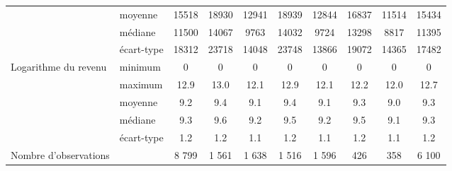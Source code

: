 \begin{Article}
\begin{refsection}[Bonnal]
\begin{appendices}
\begin{table}[!h]
{\begin{tabular}{l@{\;}l@{\;}S!{}S!{}S!{}S!{}S!{}S!{}S!{}S!{}}
		 & moyenne & 15518 & 18930 & 12941 & 18939 & 12844 & 16837 & 11514 & 15434 \\
		 & médiane & 11500 & 14067 & 9763 & 14032 & 9724 & 13298 & 8817 & 11395 \\
		 & écart-type & 18312 & 23718 & 14048 & 23748 & 13866 & 19072 & 14365 & 17482 \\\hline
		Logarithme du revenu & minimum & 0 & 0 & 0 & 0 & 0 & 0 & 0 & 0 \\
		 & maximum & 12.9 & 13.0 & 12.1 & 12.9 & 12.1 & 12.2 & 12.0 & 12.7 \\
		 & moyenne & 9.2 & 9.4 & 9.1 & 9.4 & 9.1 & 9.3 & 9.0 & 9.3 \\
		 & médiane & 9.3 & 9.6 & 9.2 & 9.5 & 9.2 & 9.5 & 9.1 & 9.3 \\
		 & écart-type & 1.2 & 1.2 & 1.1 & 1.2 & 1.1 & 1.2 & 1.1 & 1.2 \\\hline
		Nombre d'observations && 8 799 & 1 561 & 1 638 & 1 516 & 1 596 & 426 & 358 & 6 100 \\\hline \hline
	\end{tabular}
	}
	\label{quanti_variablesA}
\end{table}


\end{appendices}
\end{refsection}
\end{Article}
